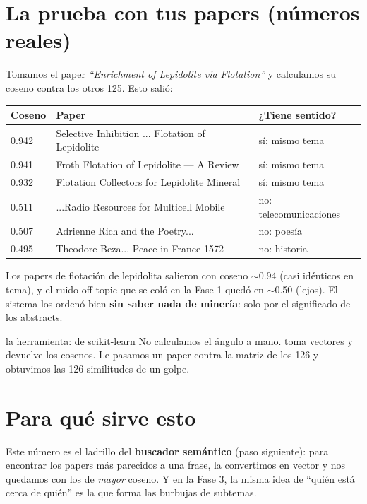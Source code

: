 \documentclass[11pt,a4paper]{article}
\begin{document}
\section{La prueba con tus papers (números reales)}

Tomamos el paper \emph{``Enrichment of Lepidolite via Flotation''} y calculamos su coseno
contra los otros 125. Esto salió:

\begin{center}
\begin{tabular}{lll}
\textbf{Coseno} & \textbf{Paper} & \textbf{¿Tiene sentido?} \\
\hline
0.942 & Selective Inhibition ... Flotation of Lepidolite & sí: mismo tema \\
0.941 & Froth Flotation of Lepidolite --- A Review & sí: mismo tema \\
0.932 & Flotation Collectors for Lepidolite Mineral & sí: mismo tema \\
\hline
0.511 & ...Radio Resources for Multicell Mobile & no: telecomunicaciones \\
0.507 & Adrienne Rich and the Poetry... & no: poesía \\
0.495 & Theodore Beza... Peace in France 1572 & no: historia \\
\end{tabular}
\end{center}

Los papers de flotación de lepidolita salieron con coseno $\sim$0.94 (casi idénticos en
tema), y el ruido off-topic que se coló en la Fase 1 quedó en $\sim$0.50 (lejos). El sistema
los ordenó bien \textbf{sin saber nada de minería}: solo por el significado de los abstracts.

\begin{concepto}{la herramienta:  de scikit-learn}
No calculamos el ángulo a mano.  toma
vectores y devuelve los cosenos. Le pasamos un paper contra la matriz de los 126 y obtuvimos
las 126 similitudes de un golpe.
\end{concepto}

\section{Para qué sirve esto}

Este número es el ladrillo del \textbf{buscador semántico} (paso siguiente): para encontrar
los papers más parecidos a una frase, la convertimos en vector y nos quedamos con los de
\emph{mayor} coseno. Y en la Fase 3, la misma idea de ``quién está cerca de quién'' es la que
forma las burbujas de subtemas.
\end{document}
